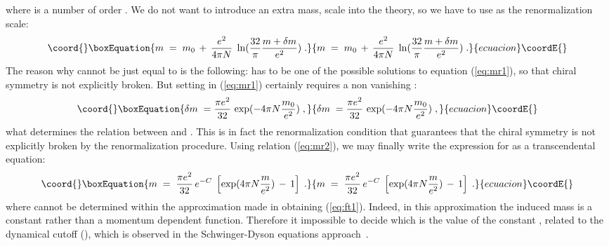 \documentclass[12pt,a4paper]{article} \usepackage[latin1] {inputenc}
\begin{document}
where \coordHE{} is a number of order \coordHE{}. We do not want to introduce an
extra mass, scale into the theory, so we have to use \coordHE{} as the renormalization scale:
\begin{equation}\coord{}\boxEquation{\label{eq:mr1}
m \;=\; m_0 \,+\, \frac{e^2}{4 \pi N} \;
\ln(\frac{32}{\pi} \frac{m + \delta m}{e^2})\;.
}{m \;=\; m_0 \,+\, \frac{e^2}{4 \pi N} \;
\ln(\frac{32}{\pi} \frac{m + \delta m}{e^2})\;.
}{ecuacion}\coordE{}\end{equation}
The reason why \myHighlight{$\mu$}\coordHE{} cannot be just equal to \coordHE{} is the following:
\coordHE{} has to be one of the possible solutions to equation
(\ref{eq:mr1}), so that chiral symmetry is not explicitly broken. But
setting \coordHE{} in (\ref{eq:mr1}) certainly requires a non vanishing
\coordHE{}:
\begin{equation}\coord{}\boxEquation{\label{eq:mr2}
\delta m \;=\frac{\pi e^2}{32} \, \exp (- 4 \pi N \frac{m_0}{e^2} ) \;,
}{\delta m \;=\frac{\pi e^2}{32} \, \exp (- 4 \pi N \frac{m_0}{e^2} ) \;,
}{ecuacion}\coordE{}\end{equation}
what determines the relation between \coordHE{} and \coordHE{}. This is in
fact the renormalization condition that guarantees that the chiral
symmetry is not explicitly broken by the renormalization procedure.
Using relation (\ref{eq:mr2}), we may finally write the expression for
\coordHE{} as a transcendental equation:
\begin{equation}\coord{}\boxEquation{\label{eq:mr3}
m \;=\; \frac{\pi e^2 }{32} \, e^{-C} \; 
\left[ \exp (4 \pi N \frac{m}{e^2}) \,-\, 1 \right]\;.
}{m \;=\; \frac{\pi e^2 }{32} \, e^{-C} \; 
\left[ \exp (4 \pi N \frac{m}{e^2}) \,-\, 1 \right]\;.
}{ecuacion}\coordE{}\end{equation}
where \coordHE{} cannot be determined within the approximation made in
obtaining (\ref{eq:ft1}). Indeed, in this approximation the induced
mass is a constant rather than a momentum dependent function.
Therefore it impossible to decide which is the value of the constant
\coordHE{}, related to the dynamical cutoff (\coordHE{}), which
is observed in the Schwinger-Dyson equations
approach~\cite{Appelquist:1988sr}.
\end{document}
